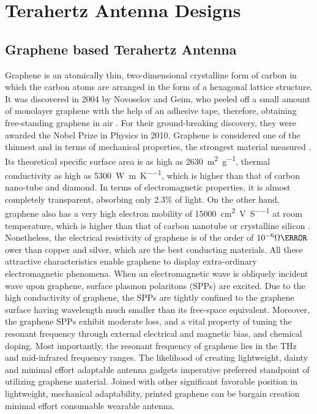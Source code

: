 \documentclass[12pt]{suhbook}
\begin{document}
\section{Terahertz Antenna Designs}
% 
\subsection{Graphene based Terahertz Antenna}
% 
Graphene is an atomically thin, two-dimensional crystalline form of carbon in which the carbon atoms are arranged in the form of a hexagonal lattice structure. It was discovered in 2004 by Novoselov and Geim, who peeled off a small amount of monolayer graphene with the help of an adhesive tape, therefore, obtaining free-standing graphene in air \cite{novoselov2004electric}. For their ground-breaking discovery, they were awarded the Nobel Prize in Physics in 2010. Graphene is considered one of the thinnest and in terms of mechanical properties, the strongest material measured  \cite{campos2008bulk,lee2013high}. Its theoretical specific surface area is as high as \SI{2630}{\square\m\per\gram}, thermal conductivity as high as \SI{5300}{\watt \per \m \per \kelvin}, which is higher than that of carbon nano-tube and diamond. In terms of electromagnetic properties, it is almost completely transparent, absorbing only 2.3\% of light. On the other hand, graphene also has a very high electron mobility of \SI{15000}{\square\cm \per\volt\per\siemens} at room temperature, which is higher than that of carbon nanotube or crystalline silicon \cite{ju2011graphene}. Nonetheless, the electrical resistivity of graphene is of the order of $10^{-6}\Omega \cm$ ower than copper and silver, which are the best conducting materials. All these attractive characteristics enable graphene to display extra-ordinary electromagnetic phenomena. When an electromagnetic wave is obliquely incident wave upon graphene, surface plasmon polaritons (SPPs) are excited. Due to the high conductivity of graphene, the SPPs are tightly confined to the graphene surface having wavelength much smaller than its free-space equivalent. Moreover, the graphene SPPs exhibit  moderate loss, and a vital property of tuning the resonant frequency through external electrical and magnetic bias, and chemical doping. Most importantly, the resonant frequency of graphene lies in the THz and mid-infrared frequency ranges. The likelihood of creating lightweight, dainty and minimal effort adaptable antenna gadgets imperative preferred standpoint of utilizing graphene material. Joined with other significant favorable position in lightweight, mechanical adaptability, printed graphene can be bargain creation minimal effort consumable wearable antenna.
\end{document}
